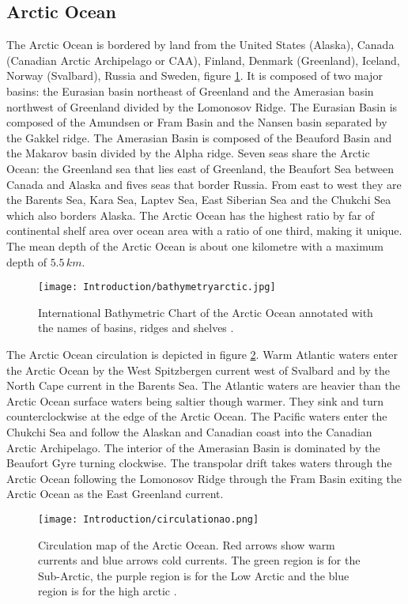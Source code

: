 \subsection{Arctic Ocean}\label{ocean}

The Arctic Ocean is bordered by land from the United States (Alaska), Canada (Canadian Arctic Archipelago or CAA), Finland, Denmark (Greenland), Iceland, Norway (Svalbard), Russia and Sweden, figure \ref{bathymetry}. It is composed of two major basins: the Eurasian basin northeast of Greenland and the Amerasian basin northwest of Greenland divided by the Lomonosov Ridge. The Eurasian Basin is composed of the Amundsen or Fram Basin and the Nansen basin separated by the Gakkel ridge. The Amerasian Basin is composed of the Beauford Basin and the Makarov basin divided by the Alpha ridge. Seven seas share the Arctic Ocean: the Greenland sea that lies east of Greenland, the Beaufort Sea between Canada and Alaska and fives seas that border Russia. From east to west they are the Barents Sea, Kara Sea, Laptev Sea, East Siberian Sea and the Chukchi Sea which also borders Alaska. The Arctic Ocean has the highest ratio by far of continental shelf area over ocean area with a ratio of one third, making it unique.  The mean depth of the Arctic Ocean is about one kilometre with a maximum depth of $5.5 \, km$. 

\begin{figure}
\center
\texttt{[image: Introduction/bathymetryarctic.jpg]}
\caption{International Bathymetric Chart of the Arctic Ocean annotated with the names of basins, ridges and shelves \citep{bathymetryarcticocean}.}
\label{bathymetry}
\end{figure}

The Arctic Ocean circulation is depicted in figure \ref{circulation}. Warm Atlantic waters enter the Arctic Ocean by the West Spitzbergen current west of Svalbard and by the North Cape current in the Barents Sea. The Atlantic waters are heavier than the Arctic Ocean surface waters being saltier though warmer. They sink and turn counterclockwise at the edge of the Arctic Ocean. The Pacific waters enter the Chukchi Sea and follow the Alaskan and Canadian coast into the Canadian Arctic Archipelago. The interior of the Amerasian Basin is dominated by the Beaufort Gyre turning clockwise. The transpolar drift takes waters through the Arctic Ocean following the Lomonosov Ridge through the Fram Basin exiting the Arctic Ocean as the East Greenland current. 

\begin{figure}
\center
\texttt{[image: Introduction/circulationao.png]}
\caption{Circulation map of the Arctic Ocean. Red arrows show warm currents and blue arrows cold currents. The green region is for the Sub-Arctic, the purple region is for the Low Arctic and the blue region is for the high arctic \citep{circulation}.  }
\label{circulation}
\end{figure}

